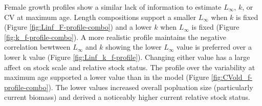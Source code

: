 \documentclass[11pt,
  english,
  a4paper,
]{article}
\begin{document}
Female growth profiles show a similar lack of information to estimate {\(L_{\infty}\)\leavevmode\tagmcend\tagstructend}, {\(k\)\leavevmode\tagmcend\tagstructend}, or CV at maximum age. Length compositions support a smaller {\(L_{\infty}\)\leavevmode\tagmcend\tagstructend} when {\(k\)\leavevmode\tagmcend\tagstructend} is fixed (Figure \ref{fig:Linf_F-profile-combo}) and a lower {\(k\)\leavevmode\tagmcend\tagstructend} when {\(L_{\infty}\)\leavevmode\tagmcend\tagstructend} is fixed (Figure \ref{fig:k_f-profile-combo}). A more realistic profile maintains the negative correlation bewtween {\(L_{\infty}\)\leavevmode\tagmcend\tagstructend} and {\(k\)\leavevmode\tagmcend\tagstructend} showing the lower {\(L_{\infty}\)\leavevmode\tagmcend\tagstructend} value is preferred over a lower k value (Figure \ref{fig:Linf_k_f-profile}). Changing either value has a large affect on stock scale and relative stock status. The profile over the variability at maximum age supported a lower value than in the model (Figure \ref{fig:CVold_f-profile-combo}). The lower values increased overall popluation size (particularly current biomass) and derived a noticeably higher current relative stock status.

\leavevmode\tagmcend\tagstructend\par

\end{document}
